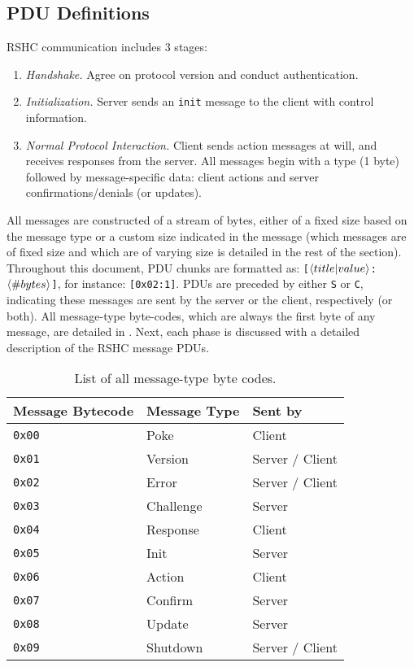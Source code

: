 \subsection{PDU Definitions}
\label{sec:pdus:pdu}

RSHC communication includes 3 stages:

\begin{enumerate}

\item {\em Handshake.} Agree on protocol version and conduct authentication.

\item {\em Initialization.} Server sends an {\tt init} message to the client with control information.

\item {\em Normal Protocol Interaction.} Client sends action messages at will, and receives responses from the server. All messages begin with a type (1 byte) followed by message-specific data: client actions and server confirmations/denials (or updates).

\end{enumerate}

All messages are constructed of a stream of bytes, either of a fixed size based on the message type or a custom size indicated in the message (which messages are of fixed size and which are of varying size is detailed in the rest of the section). Throughout this document, PDU chunks are formatted as: {\tt [$\left \langle title | value \right \rangle $:$\left \langle \#bytes \right \rangle $]}, for instance: {\tt [0x02:1]}. PDUs are preceded by either {\tt S} or {\tt C}, indicating these messages are sent by the server or the client, respectively (or both).
All message-type byte-codes, which are always the first byte of any message, are detailed in . Next, each phase is discussed with a detailed description of the RSHC message PDUs.

\begin{table}[ht!]
\centering
\begin{tabular}{l l l}
\hline
\textbf{Message Bytecode} & \textbf{Message Type} & \textbf{Sent by} \\
\hline
\hline

{\tt 0x00}  & Poke      & Client \\
{\tt 0x01}  & Version   & Server / Client \\
{\tt 0x02}  & Error     & Server / Client \\
{\tt 0x03}  & Challenge & Server \\
{\tt 0x04}  & Response  & Client \\
{\tt 0x05}  & Init      & Server \\
{\tt 0x06}  & Action    & Client \\
{\tt 0x07}  & Confirm   & Server \\
{\tt 0x08}  & Update    & Server \\
{\tt 0x09}  & Shutdown  & Server / Client \\

\hline
\hline
\end{tabular}
\caption{\label{tab:pdus:mt}List of all message-type byte codes.}
\end{table}




